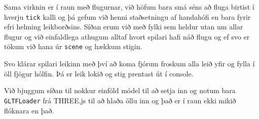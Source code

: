 \documentclass{article}
\begin{document}
Sama virknin er í raun með flugurnar, við höfum bara smá séns að fluga 
birtist í hverju \texttt{tick} kalli og þá gefum við henni staðsetningu 
af handahófi en bara fyrir efri helming leikborðsins. Síðan erum við með 
fylki sem heldur utan um allar flugur og við einfaldlega athugum alltaf 
hvort spilari hafi náð flugu og ef svo er tökum við hana úr \texttt{scene} 
og hækkum stigin. 

Svo klárar spilari leikinn með því að koma fjórum froskum alla leið yfir 
og fylla í öll fjögur hólfin. Þá er leik lokið og stig prentast út í 
console.

Við bjuggum síðan til nokkur einföld módel til að setja inn og notum bara 
\texttt{GLTFLoader} frá THREE.js til að hlaða öllu inn og það er í raun 
ekki mikið flóknara en það.
\end{document}
